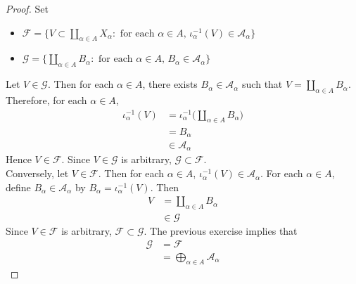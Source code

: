 \documentclass{book}
\theoremstyle{definition}
\newcommand{\al}{\alpha}
\newcommand{\MA}{\mathcal{A}}
\newcommand{\MF}{\mathcal{F}}
\newcommand{\MG}{\mathcal{G}}
\DeclareMathOperator*{\0}{\mbf{0}}
\DeclareMathOperator*{\1}{\mbf{1}}
\begin{document}
	\begin{proof}
		Set  
		\begin{itemize}
			\item $\MF= \{V \subset \coprod_{\al \in A}  X_{\al}: \text{ for each $\al \in A$, $\iota_{\al}^{-1}(V) \in \MA_{\al}$}\}$ 
			\item $\MG = \bigg \{  \coprod\limits_{\al \in A}  B_{\al}: \text{ for each $\al \in A$, } B_{\al} \in \MA_{\al} \bigg\}$
			\end{itemize}
			Let $V \in \MG$. Then for each $\al \in A$, there exists $B_{\al} \in \MA_{\al}$ such that $V =  \coprod\limits_{\al \in A}  B_{\al}$. Therefore, for each $\al \in A$, 
			\begin{align*}
				\iota_{\al}^{-1}(V)
				& = \iota_{\al}^{-1} \bigg( \coprod\limits_{\al \in A}  B_{\al} \bigg) \\
				& = B_{\al} \\
				& \in \MA_{\al}
			\end{align*}
			Hence $V \in \MF$. Since $V \in \MG$ is arbitrary, $\MG \subset \MF$. \\
			Conversely, let $V \in \MF$. Then for each $\al \in A$, $\iota_{\al}^{-1}(V) \in \MA_{\al}$. For each $\al \in A$, define $B_{\al} \in \MA_{\al}$ by $B_{\al} = \iota_{\al}^{-1}(V)$. Then 
			\begin{align*}
				V 
				& = \coprod\limits_{\al \in A} B_{\al} \\
				& \in \MG 
			\end{align*}
			Since $V \in \MF$ is arbitrary, $\MF \subset \MG$. The previous exercise implies that 
			\begin{align*}
				\MG
				& = \MF \\
				& = \bigoplus\limits_{\al \in A} \MA_{\al}
			\end{align*}
	\end{proof}
	
	
	
	
	
	
	
	
	
	
	
	
	
	
	
	
	
	
	
	
	
	
	
	
	
	
	
	
	
	
	
\end{document}
